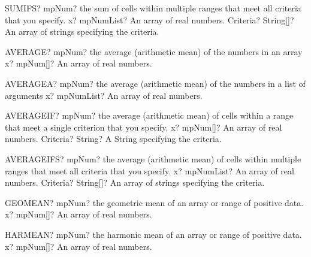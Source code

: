 \documentclass[12pt,a4paper,openany]{book}
\begin{document}
\begin{mpFunctionsExtract}
\mpWorksheetFunctionTwoNotImplemented
{SUMIFS? mpNum? the sum of cells within multiple ranges that meet all criteria that you specify.}
{x? mpNumList? An array of real numbers.}
{Criteria? String[]? An array of strings specifying the criteria.}
\end{mpFunctionsExtract}

\begin{mpFunctionsExtract}
\mpWorksheetFunctionOneNotImplemented
{AVERAGE? mpNum? the average (arithmetic mean) of the numbers in an array}
{x? mpNum[]? An array of real numbers.}
\end{mpFunctionsExtract}

\begin{mpFunctionsExtract}
\mpWorksheetFunctionOneNotImplemented
{AVERAGEA? mpNum? the average (arithmetic mean) of the numbers in a list of arguments}
{x? mpNumList? An array of real numbers.}
\end{mpFunctionsExtract}

\begin{mpFunctionsExtract}
\mpWorksheetFunctionTwoNotImplemented
{AVERAGEIF? mpNum? the average (arithmetic mean) of cells within a range that meet a single criterion that you specify.}
{x? mpNum[]? An array of real numbers.}
{Criteria? String? A String specifying the criteria.}
\end{mpFunctionsExtract}

\begin{mpFunctionsExtract}
\mpWorksheetFunctionTwoNotImplemented
{AVERAGEIFS? mpNum? the average (arithmetic mean) of cells within multiple ranges that meet all criteria that you specify.}
{x? mpNumList? An array of real numbers.}
{Criteria? String[]? An array of strings specifying the criteria.}
\end{mpFunctionsExtract}

\begin{mpFunctionsExtract}
\mpWorksheetFunctionOneNotImplemented
{GEOMEAN? mpNum? the geometric mean of an array or range of positive data.}
{x? mpNum[]? An array of real numbers.}
\end{mpFunctionsExtract}

\begin{mpFunctionsExtract}
\mpWorksheetFunctionOneNotImplemented
{HARMEAN? mpNum? the harmonic mean of an array or range of positive data.}
{x? mpNum[]? An array of real numbers.}
\end{mpFunctionsExtract}
\end{document}
